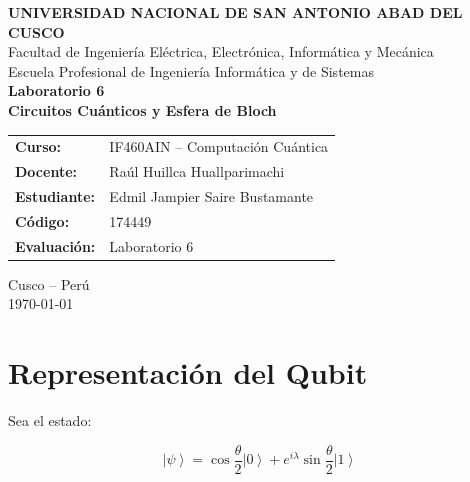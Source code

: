 \documentclass[12pt,a4paper]{article}
\newcommand{\ket}[1]{\left|#1\right\rangle}
\begin{document}
\begin{titlepage}
    \centering

    \vspace*{1cm}

    {\Large \textbf{UNIVERSIDAD NACIONAL DE SAN ANTONIO ABAD DEL CUSCO}}\\[0.4cm]
    {\large Facultad de Ingeniería Eléctrica, Electrónica, Informática y Mecánica}\\[0.2cm]
    {\large Escuela Profesional de Ingeniería Informática y de Sistemas}\\[1.5cm]

    {\Huge \textbf{Laboratorio 6}}\\[0.4cm]
    {\LARGE \textbf{Circuitos Cuánticos y Esfera de Bloch}}\\[1.2cm]

    \begin{tcolorbox}[
        colback=grisclaro,
        colframe=azulunsaac,
        width=0.85\textwidth,
        arc=2mm,
        boxrule=0.8pt
    ]
    \begin{tabular}{>{\bfseries}p{4.2cm} p{8cm}}
        Curso: & IF460AIN -- Computación Cuántica \\
        Docente: & Raúl Huillca Huallparimachi \\
        Estudiante: & Edmil Jampier Saire Bustamante \\
        Código: & 174449 \\
        Evaluación: & Laboratorio 6 \\
    \end{tabular}
    \end{tcolorbox}

    \vfill

    {\large Cusco -- Perú}\\[0.2cm]
    {\large \today}

\end{titlepage}

\tableofcontents
\newpage

\section{Representación del Qubit}

Sea el estado:

\[
\ket{\psi}=\cos\frac{\theta}{2}\ket{0}+e^{i\lambda}\sin\frac{\theta}{2}\ket{1}
\]
\end{document}
